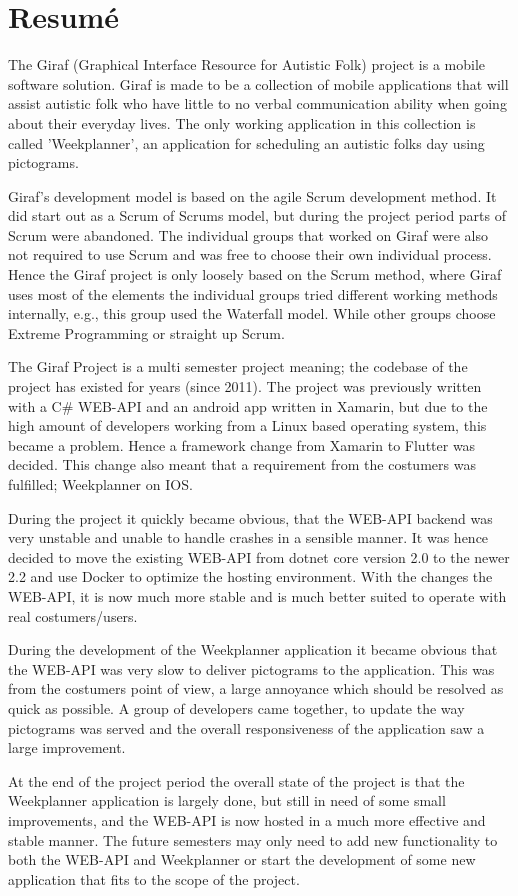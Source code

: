\chapter*{Resumé}
The Giraf (Graphical Interface Resource for Autistic Folk) project is a mobile software solution.
Giraf is made to be a collection of mobile applications that will assist autistic folk who have little to no verbal communication ability when going about their everyday lives.
The only working application in this collection is called 'Weekplanner', an application for scheduling an autistic folks day using pictograms.

Giraf's development model is based on the agile Scrum development method.
It did start out as a Scrum of Scrums model, but during the project period parts of Scrum were abandoned.
The individual groups that worked on Giraf were also not required to use Scrum and was free to choose their own individual process.
Hence the Giraf project is only loosely based on the Scrum method, where Giraf uses most of the elements the individual groups tried different working methods internally, e.g., this group used the Waterfall model.
While other groups choose Extreme Programming or straight up Scrum. 

The Giraf Project is a multi semester project meaning; the codebase of the project has existed for years (since 2011). 
The project was previously written with a C\# WEB-API and an android app written in Xamarin, but due to the high amount of developers working from a Linux based operating system, this became a problem. 
Hence a framework change from Xamarin to Flutter was decided. 
This change also meant that a requirement from the costumers was fulfilled; Weekplanner on IOS.

During the project it quickly became obvious, that the WEB-API backend was very unstable and unable to handle crashes in a sensible manner. 
It was hence decided to move the existing WEB-API from dotnet core version 2.0 to the newer 2.2 and use Docker to optimize the hosting environment. 
With the changes the WEB-API, it is now much more stable and is much better suited to operate with real costumers/users.

During the development of the Weekplanner application it became obvious that the WEB-API was very slow to deliver pictograms to the application. 
This was from the costumers point of view, a large annoyance which should be resolved as quick as possible. 
A group of developers came together, to update the way pictograms was served and the overall responsiveness of the application saw a large improvement.

At the end of the project period the overall state of the project is that the Weekplanner application is largely done, but still in need of some small improvements, and the WEB-API is now hosted in a much more effective and stable manner. 
The future semesters may only need to add new functionality to both the WEB-API and Weekplanner or start the development of some new application that fits to the scope of the project.


\newpage
